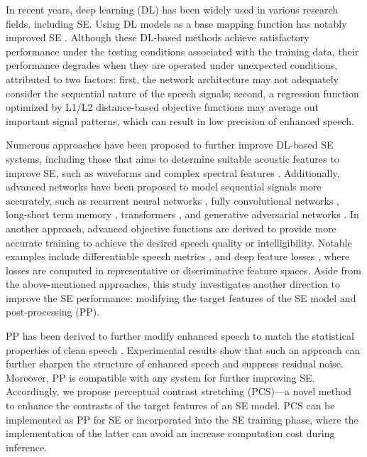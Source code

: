\documentclass[a4paper]{article}
\begin{document}
In recent years, deep learning (DL) has been widely used in various research fields, including SE.
Using DL models as a base mapping function has notably improved SE \cite{lu2013speech, xu2014regression,  liu2014experiments, han2015learning}. Although these DL-based methods achieve satisfactory performance under the testing conditions associated with the training data, their performance degrades when they are operated under unexpected conditions, attributed to two factors: first, the network architecture may not adequately consider the sequential nature of the speech signals; second, a regression function optimized by L1/L2 distance-based objective functions may average out important signal patterns, which can result in low precision of enhanced speech.


Numerous approaches have been proposed to further improve DL-based SE systems, including those that aims to determine suitable acoustic features to improve SE, such as waveforms \cite{fu2018end} and complex spectral features \cite{williamson2015complex}. Additionally, advanced networks have been proposed to model sequential signals more accurately, such as recurrent neural networks \cite{huang2015joint}, fully convolutional networks \cite{fu2018end}, long-short term memory \cite{LSTM2}, transformers \cite{kim2020t}, and generative adversarial networks \cite{pascual2017segan, fu2019metricgan}. In another approach, advanced objective functions are derived to provide more accurate training to achieve the desired speech quality or intelligibility. Notable examples include differentiable speech metrics \cite{fu2019metricgan, fu2018end}, and deep feature losses \cite{germain2019speech, hsieh2020improving}, where losses are computed in representative or discriminative feature spaces. Aside from the above-mentioned approaches, this study investigates another direction to improve the SE performance: modifying the target features of the SE model and post-processing (PP).

PP has been derived to further modify enhanced speech to match the statistical properties of clean speech \cite{xu2014regression, valin2020perceptually, chen2020truth}. Experimental results show that such an approach can further sharpen the structure of enhanced speech and suppress residual noise. Moreover, PP is compatible with any system for further improving SE. Accordingly, we propose perceptual contrast stretching (PCS)—a novel method to enhance the contrasts of the target features of an SE model. PCS can be implemented as PP for SE or incorporated into the SE training phase, where the implementation of the latter can avoid an increase computation cost during inference.
\end{document}
